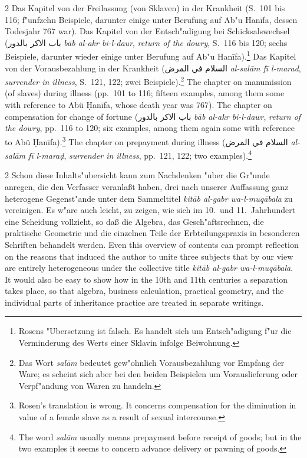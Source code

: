 \documentclass[10pt,a4paper]{article}
\renewcommand{\switchcolumn}{\syncronize\nointerlineskip\columnbreak}
\newcommand{\RL}[1]{\beginR#1\endR}
\newcommand{\ar}[1]{{\arabicfont\RL{#1}}}
\begin{document}
\begin{paracol}{2}
Das Kapitel von der Freilassung (von Sklaven) in der Krankheit (S.\ 101 bis 116; f"unfzehn Beispiele, darunter einige unter Berufung auf Ab"u Han\={i}fa, dessen Todesjahr 767 war). Das Kapitel von der Entsch"adigung bei Schicksalswechsel (\ar{باب الاكر بالدور} \textit{b\=ab al-akr bi-l-daur}, \textit{return of the dowry}, S.\ 116 bis 120; sechs Beispiele, darunter wieder einige unter Berufung auf Ab"u Han\={i}fa).\footnote{Rosens "Ubersetzung ist falsch. Es handelt sich um Entsch"adigung f"ur die Verminderung des Werts einer Sklavin infolge Beiwohnung.} Das Kapitel von der Vorausbezahlung in der Krankheit (\ar{السلام في المرض} \textit{al-sal\=am f\=i{} l-marad}, \textit{surrender in illness}, S.\ 121, 122; zwei Beispiele).\footnote{Das Wort \textit{sal\=am} bedeutet gew"ohnlich Vorausbezahlung vor Empfang der Ware; es scheint sich aber bei den beiden Beispielen um Vorauslieferung oder Verpf"andung von Waren zu handeln.}
\switchcolumn
The chapter on manumission (of slaves) during illness (pp.\ 101 to 116; fifteen examples, among them some with reference to Ab\"u \d{H}an\={i}fa, whose death year was 767). The chapter on compensation for change of fortune (\ar{باب الاكر بالدور} \textit{b\=ab al-akr bi-l-dawr}, \textit{return of the dowry}, pp.\ 116 to 120; six examples, among them again some with reference to Ab\"u \d{H}an\={i}fa).\footnote{Rosen's translation is wrong. It concerns compensation for the diminution in value of a female slave as a result of sexual intercourse.} The chapter on prepayment during illness (\ar{السلام في المرض} \textit{al-sal\=am f\={i} l-mara\d{d}}, \textit{surrender in illness}, pp.\ 121, 122; two examples).\footnote{The word \textit{sal\=am} usually means prepayment before receipt of goods; but in the two examples it seems to concern advance delivery or pawning of goods.}
\end{paracol}

\begin{paracol}{2}
Schon diese Inhalts"ubersicht kann zum Nachdenken "uber die Gr"unde anregen, die den Verfasser veranla\ss{}t haben, drei nach unserer Auffassung ganz heterogene Gegenst"ande unter dem Sammeltitel \textit{kit\=ab al-gabr wa-l-muq\=abala} zu vereinigen. Es w"are auch leicht, zu zeigen, wie sich im 10.\ und 11.\ Jahrhundert eine Scheidung vollzieht, so da\ss{} die Algebra, das Gesch"aftsrechnen, die praktische Geometrie und die einzelnen Teile der Erbteilungspraxis in besonderen Schriften behandelt werden.
\switchcolumn
Even this overview of contents can prompt reflection on the reasons that induced the author to unite three subjects that by our view are entirely heterogeneous under the collective title \textit{kit\=ab al-gabr wa-l-muq\=abala}. It would also be easy to show how in the 10th and 11th centuries a separation takes place, so that algebra, business calculation, practical geometry, and the individual parts of inheritance practice are treated in separate writings.
\end{paracol}
\end{document}
